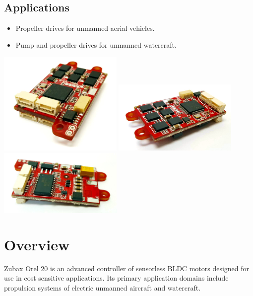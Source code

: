 \documentclass{zubaxdoc}
\begin{document}
\begin{titlepage}
\BeginRightColumn
\section*{Applications}

\begin{itemize}
    \item Propeller drives for unmanned aerial vehicles.
    \item Pump and propeller drives for unmanned watercraft.
\end{itemize}

\centering
\includegraphics[width=0.45\textwidth]{image}
\includegraphics[width=0.45\textwidth]{image2}
\includegraphics[width=0.45\textwidth]{bottom}

\end{titlepage}

\tableofcontents
\listoffigures
\listoftables

\mainmatter

\chapter{Overview}

Zubax Orel 20 is an advanced controller of sensorless BLDC motors designed for use in
cost sensitive applications.
Its primary application domains include propulsion systems of electric unmanned aircraft
and watercraft.
\end{document}

